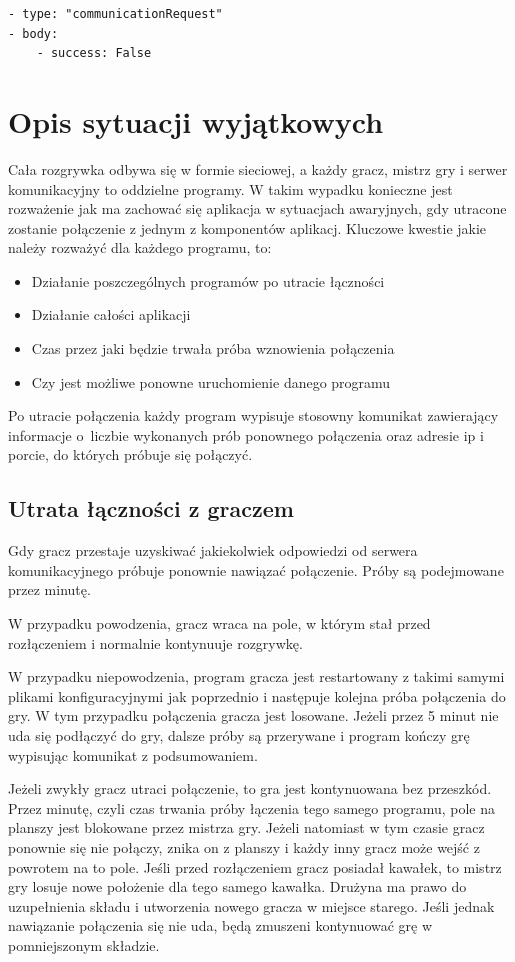 \documentclass[a4paper]{article}
\begin{document}
\begin{verbatim}
- type: "communicationRequest"
- body:
    - success: False
\end{verbatim}

\section{Opis sytuacji wyjątkowych}

Cała rozgrywka odbywa się w formie sieciowej, a każdy gracz, mistrz gry i serwer komunikacyjny to oddzielne programy. W takim wypadku konieczne jest rozważenie jak ma zachować się aplikacja w sytuacjach awaryjnych, gdy utracone zostanie połączenie z jednym z komponentów aplikacj. Kluczowe kwestie jakie należy rozważyć dla każdego programu, to:
\begin{itemize}
\item Działanie poszczególnych programów po utracie łączności
\item Działanie całości aplikacji 
\item Czas przez jaki będzie trwała próba wznowienia połączenia
\item Czy jest możliwe ponowne uruchomienie danego programu
\end{itemize}

Po utracie połączenia każdy program wypisuje stosowny komunikat zawierający informacje o~liczbie wykonanych prób ponownego połączenia oraz adresie ip i porcie, do których próbuje się połączyć. 

\subsection{Utrata łączności z graczem}
Gdy gracz przestaje uzyskiwać jakiekolwiek odpowiedzi od serwera komunikacyjnego próbuje ponownie nawiązać połączenie. Próby są podejmowane przez minutę. 

W przypadku powodzenia, gracz wraca na pole, w którym stał przed rozłączeniem i normalnie kontynuuje rozgrywkę.

W przypadku niepowodzenia, program gracza jest restartowany z takimi samymi plikami konfiguracyjnymi jak poprzednio i następuje kolejna próba połączenia do gry. W tym przypadku połączenia gracza jest losowane. Jeżeli przez 5 minut nie uda się podłączyć do gry, dalsze próby są przerywane i program kończy grę wypisując komunikat z podsumowaniem.

Jeżeli zwykły gracz utraci połączenie, to gra jest kontynuowana bez przeszkód. Przez minutę, czyli czas trwania próby łączenia tego samego programu, pole na planszy jest blokowane przez mistrza gry. Jeżeli natomiast w tym czasie gracz ponownie się nie połączy, znika on z planszy i każdy inny gracz może wejść z powrotem na to pole. Jeśli przed rozłączeniem gracz posiadał kawałek, to mistrz gry losuje nowe położenie dla tego samego kawałka. Drużyna ma prawo do uzupełnienia składu i utworzenia nowego gracza w miejsce starego. Jeśli jednak nawiązanie połączenia się nie uda, będą zmuszeni kontynuować grę w pomniejszonym składzie.
\end{document}
